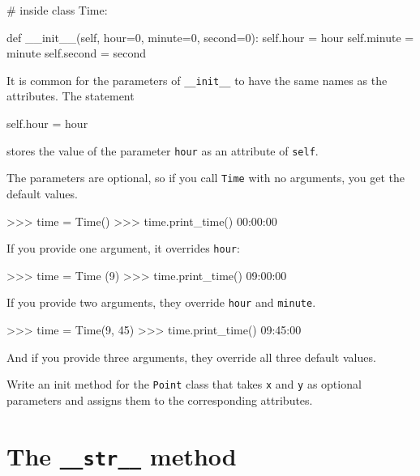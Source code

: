 \beforeverb
\begin{pycode}
# inside class Time:

    def __init__(self, hour=0, minute=0, second=0):
        self.hour = hour
        self.minute = minute
        self.second = second
\end{pycode}
\afterverb
%
It is common for the parameters of \verb"__init__"
to have the same names as the attributes.  The statement

\beforeverb
\begin{pycode}
        self.hour = hour
\end{pycode}
\afterverb
%
stores the value of the parameter {\tt hour} as an attribute
of {\tt self}.


The parameters are optional, so if you call {\tt Time} with
no arguments, you get the default values.

\beforeverb
\begin{pyinterpreter}
>>> time = Time()
>>> time.print_time()
00:00:00
\end{pyinterpreter}
\afterverb
%
If you provide one argument, it overrides {\tt hour}:

\beforeverb
\begin{pyinterpreter}
>>> time = Time (9)
>>> time.print_time()
09:00:00
\end{pyinterpreter}
\afterverb
%
If you provide two arguments, they override {\tt hour} and
{\tt minute}.

\beforeverb
\begin{pyinterpreter}
>>> time = Time(9, 45)
>>> time.print_time()
09:45:00
\end{pyinterpreter}
\afterverb
%
And if you provide three arguments, they override all three
default values.


\begin{exercise}

Write an init method for the {\tt Point} class that takes
{\tt x} and {\tt y} as optional parameters and assigns
them to the corresponding attributes.
\end{exercise}


\section{The {\tt \_\_str\_\_} method}


